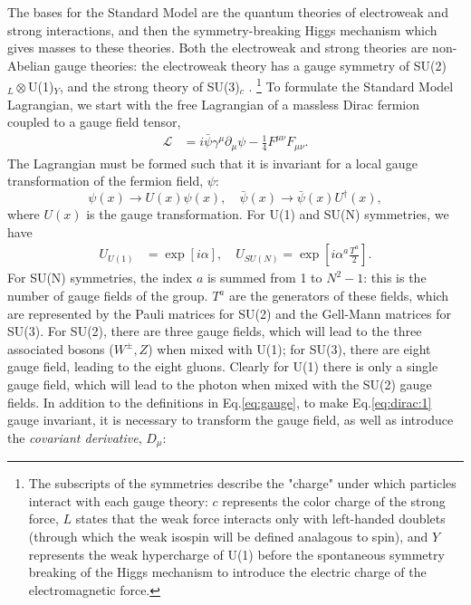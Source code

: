 \documentclass[a4paper,12pt]{article}
\begin{document}
The bases for the Standard Model are the quantum theories of electroweak and strong interactions, and then the symmetry-breaking Higgs mechanism which gives masses to these theories.
Both the electroweak and strong theories are non-Abelian gauge theories: the electroweak theory has a gauge symmetry of SU(2)$_{L}\otimes$U(1)$_Y$, and the strong theory of SU(3)$_{c}$ \cite{bail}.
\hspace{-10pt}\footnote{The subscripts of the symmetries describe the "charge" under which particles interact with each gauge theory: $c$ represents the color charge of the strong force, $L$ states that the weak force interacts only with left-handed doublets (through which the weak isospin will be defined analagous to spin), and $Y$ represents the weak hypercharge of U(1) before the spontaneous symmetry breaking of the Higgs mechanism to introduce the electric charge of the electromagnetic force.\cite{schwartz}}
\hspace{-5pt}To formulate the Standard Model Lagrangian, we start with the free Lagrangian of a massless Dirac fermion coupled to a gauge field tensor,
\begin{align}
    \label{eq:dirac:1}
    \mathcal{L} &= i\bar{\psi}\gamma^\mu\partial_\mu\psi - \frac14F^{\mu\nu}F_{\mu\nu}.
\end{align}
The Lagrangian must be formed such that it is invariant for a local gauge transformation of the fermion field, $\psi$:
\begin{equation}
    \label{eq:local}
    \psi(x)\to U(x)\psi(x),\quad \bar{\psi}(x)\to\bar{\psi}(x)U^\dagger(x),
\end{equation}
where $U(x)$ is the gauge transformation.
For U(1) and SU(N) symmetries, we have
\begin{align}
    \label{eq:gauge} 
    U_{U(1)} &= \exp\left[i\alpha\right],\quad U_{SU(N)} = \exp\left[i\alpha^a\frac{T^a}{2}\right].
\end{align}
For SU(N) symmetries, the index $a$ is summed from 1 to $N^2-1$: this is the number of gauge fields of the group.
$T^a$ are the generators of these fields, which are represented by the Pauli matrices for SU(2) and the Gell-Mann matrices for SU(3).
For SU(2), there are three gauge fields, which will lead to the three associated bosons ($W^{\pm},Z$) when mixed with U(1); for SU(3), there are eight gauge field, leading to the eight gluons.
Clearly for U(1) there is only a single gauge field, which will lead to the photon when mixed with the SU(2) gauge fields.
In addition to the definitions in Eq.\eqref{eq:gauge}, to make Eq.\eqref{eq:dirac:1} gauge invariant, it is necessary to transform the gauge field, as well as introduce the \textit{covariant derivative}, $D_\mu$:
\end{document}
